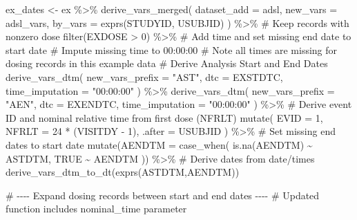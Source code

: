 \documentclass[
  letterpaper,
  DIV=11,
  numbers=noendperiod]{scrreprt}
\newenvironment{Shaded}{\begin{snugshade}}{\end{snugshade}}
\newcommand{\AttributeTok}[1]{\textcolor[rgb]{0.40,0.45,0.13}{#1}}
\newcommand{\CommentTok}[1]{\textcolor[rgb]{0.37,0.37,0.37}{#1}}
\newcommand{\ConstantTok}[1]{\textcolor[rgb]{0.56,0.35,0.01}{#1}}
\newcommand{\DecValTok}[1]{\textcolor[rgb]{0.68,0.00,0.00}{#1}}
\newcommand{\FunctionTok}[1]{\textcolor[rgb]{0.28,0.35,0.67}{#1}}
\newcommand{\NormalTok}[1]{\textcolor[rgb]{0.00,0.23,0.31}{#1}}
\newcommand{\OtherTok}[1]{\textcolor[rgb]{0.00,0.23,0.31}{#1}}
\newcommand{\SpecialCharTok}[1]{\textcolor[rgb]{0.37,0.37,0.37}{#1}}
\newcommand{\StringTok}[1]{\textcolor[rgb]{0.13,0.47,0.30}{#1}}
\begin{document}
\begin{Shaded}
\begin{Highlighting}[]
\NormalTok{ex\_dates }\OtherTok{\textless{}{-}}\NormalTok{ ex }\SpecialCharTok{\%\textgreater{}\%}
  \FunctionTok{derive\_vars\_merged}\NormalTok{(}
    \AttributeTok{dataset\_add =}\NormalTok{ adsl,}
    \AttributeTok{new\_vars =}\NormalTok{ adsl\_vars,}
    \AttributeTok{by\_vars =} \FunctionTok{exprs}\NormalTok{(STUDYID, USUBJID)}
\NormalTok{  ) }\SpecialCharTok{\%\textgreater{}\%}
  \CommentTok{\# Keep records with nonzero dose}
  \FunctionTok{filter}\NormalTok{(EXDOSE }\SpecialCharTok{\textgreater{}} \DecValTok{0}\NormalTok{) }\SpecialCharTok{\%\textgreater{}\%}
  \CommentTok{\# Add time and set missing end date to start date}
  \CommentTok{\# Impute missing time to 00:00:00}
  \CommentTok{\# Note all times are missing for dosing records in this example data}
  \CommentTok{\# Derive Analysis Start and End Dates}
  \FunctionTok{derive\_vars\_dtm}\NormalTok{(}
    \AttributeTok{new\_vars\_prefix =} \StringTok{"AST"}\NormalTok{,}
    \AttributeTok{dtc =}\NormalTok{ EXSTDTC,}
    \AttributeTok{time\_imputation =} \StringTok{"00:00:00"}
\NormalTok{  ) }\SpecialCharTok{\%\textgreater{}\%}
  \FunctionTok{derive\_vars\_dtm}\NormalTok{(}
    \AttributeTok{new\_vars\_prefix =} \StringTok{"AEN"}\NormalTok{,}
    \AttributeTok{dtc =}\NormalTok{ EXENDTC,}
    \AttributeTok{time\_imputation =} \StringTok{"00:00:00"}
\NormalTok{  ) }\SpecialCharTok{\%\textgreater{}\%}
  \CommentTok{\# Derive event ID and nominal relative time from first dose (NFRLT)}
  \FunctionTok{mutate}\NormalTok{(}
    \AttributeTok{EVID =} \DecValTok{1}\NormalTok{,}
    \AttributeTok{NFRLT =} \DecValTok{24} \SpecialCharTok{*}\NormalTok{ (VISITDY }\SpecialCharTok{{-}} \DecValTok{1}\NormalTok{), }\AttributeTok{.after =}\NormalTok{ USUBJID}
\NormalTok{  ) }\SpecialCharTok{\%\textgreater{}\%}
  \CommentTok{\# Set missing end dates to start date}
  \FunctionTok{mutate}\NormalTok{(}\AttributeTok{AENDTM =} \FunctionTok{case\_when}\NormalTok{(}
    \FunctionTok{is.na}\NormalTok{(AENDTM) }\SpecialCharTok{\textasciitilde{}}\NormalTok{ ASTDTM,}
    \ConstantTok{TRUE} \SpecialCharTok{\textasciitilde{}}\NormalTok{ AENDTM}
\NormalTok{  )) }\SpecialCharTok{\%\textgreater{}\%}
  \CommentTok{\# Derive dates from date/times}
  \FunctionTok{derive\_vars\_dtm\_to\_dt}\NormalTok{(}\FunctionTok{exprs}\NormalTok{(ASTDTM,AENDTM))}

\CommentTok{\# {-}{-}{-}{-} Expand dosing records between start and end dates {-}{-}{-}{-}}
\CommentTok{\# Updated function includes nominal\_time parameter}


\end{Highlighting}
\end{Shaded}
\end{document}

